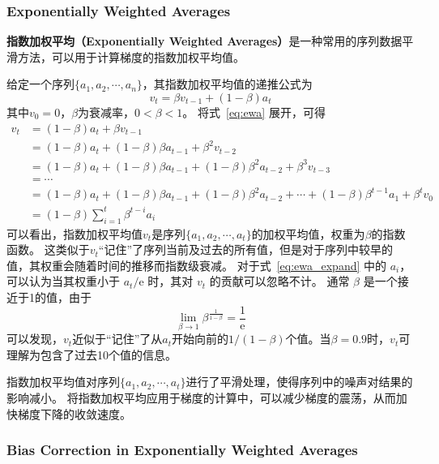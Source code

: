 \subsubsection{Exponentially Weighted Averages}

\textbf{指数加权平均（Exponentially Weighted Averages）}是一种常用的序列数据平滑方法，可以用于计算梯度的指数加权平均值。

给定一个序列$\{a_1, a_2, \cdots, a_n\}$，其指数加权平均值的递推公式为
\begin{equation}
    v_t = \beta v_{t-1} + (1 - \beta)a_t
    \label{eq:ewa}
\end{equation}
其中$v_0 = 0$，$\beta$为衰减率，$0 < \beta < 1$。
将式~\eqref{eq:ewa} 展开，可得
\begin{equation}
    \begin{aligned}
        v_t &= (1 - \beta)a_t + \beta v_{t-1} \\
            &= (1 - \beta)a_t + (1 - \beta)\beta a_{t-1} + \beta^2 v_{t-2} \\
            &= (1 - \beta)a_t + (1 - \beta)\beta a_{t-1} + (1 - \beta)\beta^2 a_{t-2} + \beta^3 v_{t-3} \\
            &= \cdots \\
            &= (1 - \beta)a_t + (1 - \beta)\beta a_{t-1} + (1 - \beta)\beta^2 a_{t-2} + \cdots + (1 - \beta)\beta^{t-1}a_1 + \beta^t v_0 \\
            &= (1 - \beta)\sum_{i=1}^t\beta^{t-i}a_i
    \end{aligned}
    \label{eq:ewa_expand}
\end{equation}
可以看出，指数加权平均值$v_t$是序列$\{a_1, a_2, \cdots, a_t\}$的加权平均值，权重为$\beta$的指数函数。
这类似于$v_t$“记住”了序列当前及过去的所有值，但是对于序列中较早的值，其权重会随着时间的推移而指数级衰减。
对于式~\eqref{eq:ewa_expand} 中的 $a_i$，可以认为当其权重小于 $a_t/\mathrm{e}$ 时，其对 $v_t$ 的贡献可以忽略不计。
通常 $\beta$ 是一个接近于1的值，由于
\begin{equation}
    \lim_{\beta \to 1}  \beta^{\frac{\scriptstyle 1}{\scriptstyle 1-\beta}} = \frac{1}{\mathrm{e}}
\end{equation}
可以发现，$v_t$近似于“记住”了从$a_t$开始向前的$1/(1-\beta)$个值。当$\beta=0.9$时，$v_t$可理解为包含了过去10个值的信息。

指数加权平均值对序列$\{a_1, a_2, \cdots, a_t\}$进行了平滑处理，使得序列中的噪声对结果的影响减小。
将指数加权平均应用于梯度的计算中，可以减少梯度的震荡，从而加快梯度下降的收敛速度。

\subsubsection{Bias Correction in Exponentially Weighted Averages}

